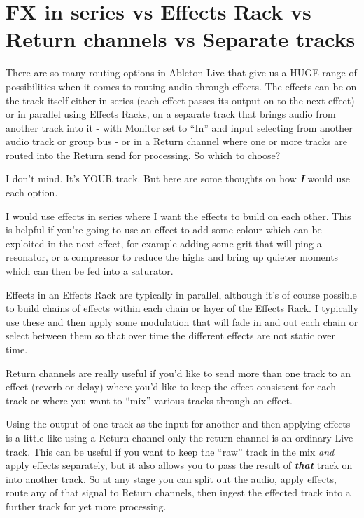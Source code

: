 \documentclass[
  12pt,
  letterpaper,
  oneside,
  open=any]{scrbook}
\begin{document}
\section{FX in series vs Effects Rack vs Return channels vs Separate
tracks}\label{fx-in-series-vs-effects-rack-vs-return-channels-vs-separate-tracks}

There are so many routing options in Ableton Live that give us a HUGE
range of possibilities when it comes to routing audio through effects.
The effects can be on the track itself either in series (each effect
passes its output on to the next effect) or in parallel using Effects
Racks, on a separate track that brings audio from another track into it
- with Monitor set to ``In'' and input selecting from another audio
track or group bus - or in a Return channel where one or more tracks are
routed into the Return send for processing. So which to choose?

I don't mind. It's YOUR track. But here are some thoughts on how
\textbf{\emph{I}} would use each option.

I would use effects in series where I want the effects to build on each
other. This is helpful if you're going to use an effect to add some
colour which can be exploited in the next effect, for example adding
some grit that will ping a resonator, or a compressor to reduce the
highs and bring up quieter moments which can then be fed into a
saturator.

Effects in an Effects Rack are typically in parallel, although it's of
course possible to build chains of effects within each chain or layer of
the Effects Rack. I typically use these and then apply some modulation
that will fade in and out each chain or select between them so that over
time the different effects are not static over time.

Return channels are really useful if you'd like to send more than one
track to an effect (reverb or delay) where you'd like to keep the effect
consistent for each track or where you want to ``mix'' various tracks
through an effect.

Using the output of one track as the input for another and then applying
effects is a little like using a Return channel only the return channel
is an ordinary Live track. This can be useful if you want to keep the
``raw'' track in the mix \emph{and} apply effects separately, but it
also allows you to pass the result of \textbf{\emph{that}} track on into
another track. So at any stage you can split out the audio, apply
effects, route any of that signal to Return channels, then ingest the
effected track into a further track for yet more processing.
\end{document}

